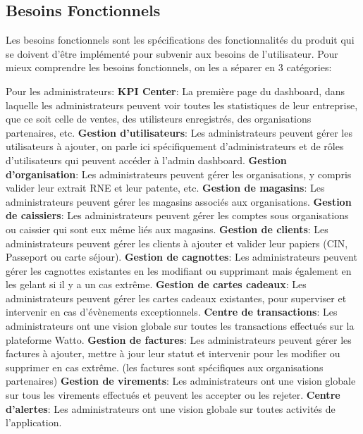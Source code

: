 \documentclass[../main.tex]{subfiles}
\begin{document}
\subsection{Besoins Fonctionnels}
Les besoins fonctionnels sont les spécifications des fonctionnalités du produit qui se doivent d'être implémenté pour subvenir aux besoins de l'utilisateur.\cite{functional_req}
\newline
Pour mieux comprendre les besoins fonctionnels, on les a séparer en 3 catégories:
\begin{outline}
 \1 Pour les administrateurs:
    \2 \textbf{KPI Center}: La première page du dashboard, dans laquelle les administrateurs peuvent voir toutes les statistiques de leur entreprise, que ce soit celle de ventes, des utilisteurs enregistrés, des organisations partenaires, etc.
    \2 \textbf{Gestion d'utilisateurs}: Les administrateurs peuvent gérer les utilisateurs à ajouter, on parle ici spécifiquement d'administrateurs et de rôles d'utilisateurs qui peuvent accéder à l'admin dashboard. 
    \2 \textbf{Gestion d'organisation}: Les administrateurs peuvent gérer les organisations, y compris valider leur extrait RNE et leur patente, etc.\2 \textbf{Gestion de magasins}: Les administrateurs peuvent gérer les magasins associés aux organisations. 
    \2 \textbf{Gestion de caissiers}: Les administrateurs peuvent gérer les comptes sous organisations ou caissier qui sont eux même liés aux magasins. 
    \2 \textbf{Gestion de clients}: Les administrateurs peuvent gérer les clients à ajouter et valider leur papiers (CIN, Passeport ou carte séjour).
    \2 \textbf{Gestion de cagnottes}: Les administrateurs peuvent gérer les cagnottes existantes en les modifiant ou supprimant mais également en les gelant si il y a un cas extrême. 
    \2 \textbf{Gestion de cartes cadeaux}: Les administrateurs peuvent gérer les cartes cadeaux existantes, pour superviser et intervenir en cas d'évènements exceptionnels. 
    \2 \textbf{Centre de transactions}: Les administrateurs ont une vision globale sur toutes les transactions effectués sur la plateforme Watto. 
    \2 \textbf{Gestion de factures}: Les administrateurs peuvent gérer les factures à ajouter, mettre à jour leur statut et intervenir pour les modifier ou supprimer en cas extrême. (les factures sont spécifiques aux organisations partenaires)  
    \2 \textbf{Gestion de virements}: Les administrateurs ont une vision globale sur tous les virements effectués et peuvent les accepter ou les rejeter. 
    \2 \textbf{Centre d'alertes}: Les administrateurs ont une vision globale sur toutes activités de l'application. 

\end{outline}
\end{document}
